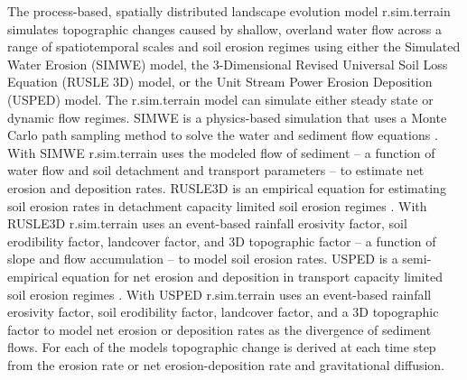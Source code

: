 \documentclass[gmd, manuscript]{copernicus}
\begin{document}
The process-based, spatially distributed 
landscape evolution model r.sim.terrain
simulates topographic changes
caused by shallow, overland water flow
across a range of spatiotemporal scales and soil erosion regimes
using either
the Simulated Water Erosion (SIMWE) model, 
the 3-Dimensional Revised Universal Soil Loss Equation (RUSLE 3D) model,
or the Unit Stream Power Erosion Deposition (USPED) model.  
The r.sim.terrain model
can simulate either steady state or dynamic flow regimes.
SIMWE is a physics-based simulation
that uses a Monte Carlo path sampling method
to solve the water and sediment flow equations
\citep{Mitas1998,Mitasova2004}. 
With SIMWE 
r.sim.terrain
uses the modeled flow of sediment 
-- a function of water flow and soil detachment and transport parameters -- 
to estimate net erosion and deposition rates. 
RUSLE3D is an empirical equation for estimating soil erosion rates
in detachment capacity limited soil erosion regimes 
\citep{Mitasova1996,Mitasova2013}. 
With RUSLE3D
r.sim.terrain
uses an event-based rainfall erosivity factor, 
soil erodibility factor, landcover factor, and 3D topographic factor
-- a function of slope and flow accumulation --
to model soil erosion rates. 
USPED is a semi-empirical equation for net erosion and deposition 
in transport capacity limited soil erosion regimes 
\citep{Mitasova1996,Mitasova2013}. 
With USPED r.sim.terrain uses an event-based rainfall erosivity factor, 
soil erodibility factor, landcover factor, and a 3D topographic factor
to model net erosion or deposition rates as the divergence of sediment flows. 
For each of the models 
topographic change is derived at each time step
from the erosion rate or net erosion-deposition rate
and gravitational diffusion.
\end{document}
